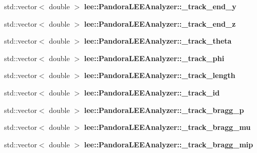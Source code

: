 \begin{DoxyCompactItemize}
\item 
\hypertarget{group__lee_ga55174718268fd53d080c224f60f96488}{std\-::vector$<$ double $>$ {\bfseries lee\-::\-Pandora\-L\-E\-E\-Analyzer\-::\-\_\-track\-\_\-end\-\_\-y}}\label{group__lee_ga55174718268fd53d080c224f60f96488}

\item 
\hypertarget{group__lee_ga147c8d113ee9fc316a7addd39e392d71}{std\-::vector$<$ double $>$ {\bfseries lee\-::\-Pandora\-L\-E\-E\-Analyzer\-::\-\_\-track\-\_\-end\-\_\-z}}\label{group__lee_ga147c8d113ee9fc316a7addd39e392d71}

\item 
\hypertarget{group__lee_ga320eaa4a60f4628c6320c5c721f2899c}{std\-::vector$<$ double $>$ {\bfseries lee\-::\-Pandora\-L\-E\-E\-Analyzer\-::\-\_\-track\-\_\-theta}}\label{group__lee_ga320eaa4a60f4628c6320c5c721f2899c}

\item 
\hypertarget{group__lee_gae045ae6a478b38e3d165ced855b610e4}{std\-::vector$<$ double $>$ {\bfseries lee\-::\-Pandora\-L\-E\-E\-Analyzer\-::\-\_\-track\-\_\-phi}}\label{group__lee_gae045ae6a478b38e3d165ced855b610e4}

\item 
\hypertarget{group__lee_ga801ed095fb9dfb752f424ea91107cffc}{std\-::vector$<$ double $>$ {\bfseries lee\-::\-Pandora\-L\-E\-E\-Analyzer\-::\-\_\-track\-\_\-length}}\label{group__lee_ga801ed095fb9dfb752f424ea91107cffc}

\item 
\hypertarget{group__lee_ga13a633d3b83e96b70adae044df973ec7}{std\-::vector$<$ double $>$ {\bfseries lee\-::\-Pandora\-L\-E\-E\-Analyzer\-::\-\_\-track\-\_\-id}}\label{group__lee_ga13a633d3b83e96b70adae044df973ec7}

\item 
\hypertarget{group__lee_ga4297d696c8a18a62866df4ae2af0115f}{std\-::vector$<$ double $>$ {\bfseries lee\-::\-Pandora\-L\-E\-E\-Analyzer\-::\-\_\-track\-\_\-bragg\-\_\-p}}\label{group__lee_ga4297d696c8a18a62866df4ae2af0115f}

\item 
\hypertarget{group__lee_ga26c2928e27efaef45a0bd73265732f61}{std\-::vector$<$ double $>$ {\bfseries lee\-::\-Pandora\-L\-E\-E\-Analyzer\-::\-\_\-track\-\_\-bragg\-\_\-mu}}\label{group__lee_ga26c2928e27efaef45a0bd73265732f61}

\item 
\hypertarget{group__lee_ga54899eb2a96c6b30e3aa350877ee396f}{std\-::vector$<$ double $>$ {\bfseries lee\-::\-Pandora\-L\-E\-E\-Analyzer\-::\-\_\-track\-\_\-bragg\-\_\-mip}}\label{group__lee_ga54899eb2a96c6b30e3aa350877ee396f}


\end{DoxyCompactItemize}
